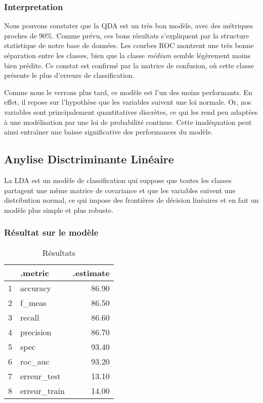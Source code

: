 \documentclass[a4paper,11pt]{article}
\begin{document}
\subsubsection{Interpretation}

Nous pouvons constater que la QDA est un très bon modèle, avec des métriques proches de 90\%. Comme prévu, ces bons résultats s'expliquent par la structure statistique de notre base de données. Les courbes ROC montrent une très bonne séparation entre les classes, bien que la classe \textit{médium} semble légèrement moins bien prédite. Ce constat est confirmé par la matrice de confusion, où cette classe présente le plus d'erreurs de classification.

Comme nous le verrons plus tard, ce modèle est l’un des moins performants. En effet, il repose sur l’hypothèse que les variables suivent une loi normale. Or, nos variables sont principalement quantitatives discrètes, ce qui les rend peu adaptées à une modélisation par une loi de probabilité continue. Cette inadéquation peut ainsi entraîner une baisse significative des performances du modèle.

\newpage

\subsection{Anylise Disctriminante Linéaire}

La LDA est un modèle de classification qui suppose que toutes les classes partagent une même matrice de covariance et que les variables suivent une distribution normal, ce qui impose des frontières de décision linéaires et en fait un modèle plus simple et plus robuste.


\subsubsection{Résultat sur le modèle}

\begin{center}


\begin{table}[ht]
\centering
\begin{tabular}{rlr}
  \hline
 & .metric & .estimate \\ 
  \hline
1 & accuracy & 86.90 \\ 
  2 & f\_meas & 86.50 \\ 
  3 & recall & 86.60 \\ 
  4 & precision & 86.70 \\ 
  5 & spec & 93.40 \\ 
  6 & roc\_auc & 93.20 \\ 
  7 & erreur\_test & 13.10 \\ 
  8 & erreur\_train & 14.00 \\ 
   \hline
\end{tabular}
\caption{Résultats} 
\end{table}
\end{center}
\end{document}
